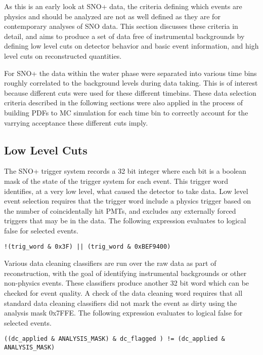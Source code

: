 As this is an early look at SNO+ data, the criteria defining which events are physics and should be analyzed are not as well defined as they are for contemporary analyses of SNO data.
This section discusses these criteria in detail, and aims to produce a set of data free of instrumental backgrounds by defining low level cuts on detector behavior and basic event information, and high level cuts on reconstructed quantities.

For SNO+ the data within the water phase were separated into various time bins roughly correlated to the background levels during data taking.
This is of interest because different cuts were used for these different timebins.
These data selection criteria described in the following sections were also applied in the process of building PDFs to MC simulation for each time bin to correctly account for the varrying acceptance these different cuts imply.

\subsection{Low Level Cuts}

The SNO+ trigger system records a 32 bit integer where each bit is a boolean mask of the state of the trigger system for each event.
This trigger word identifies, at a very low level, what caused the detector to take data.
Low level event selection requires that the trigger word include a physics trigger based on the number of coincidentally hit PMTs, and excludes any externally forced triggers that may be in the data.
The following expression evaluates to logical false for selected events.

\begin{verbatim}
!(trig_word & 0x3F) || (trig_word & 0xBEF9400)
\end{verbatim}

Various data cleaning classifiers are run over the raw data as part of reconstruction, with the goal of identifying instrumental backgrounds or other non-physics events.
These classifiers produce another 32 bit word which can be checked for event quality.
A check of the data cleaning word requires that all standard data cleaning classifiers did not mark the event as dirty using the analysis mask 0x7FFE.
The following expression evaluates to logical false for selected events.

\begin{verbatim}
((dc_applied & ANALYSIS_MASK) & dc_flagged ) != (dc_applied & ANALYSIS_MASK)
\end{verbatim}

